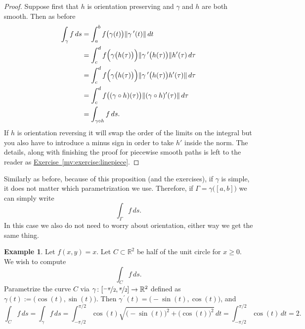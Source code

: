 \documentclass[12pt]{book}
\newcommand{\snorm}[1]{\lVert {#1} \rVert}
\newcommand{\R}{{\mathbb{R}}}
\theoremstyle{plain}
\theoremstyle{remark}
\theoremstyle{definition}
\theoremstyle{exercise}
\theoremstyle{example}
\newtheorem{example}[thm]{Example}
\newcommand{\exerciseref}[1]{\hyperref[#1]{Exercise~\ref*{#1}}}
\begin{document}
\begin{proof}
Suppose first that $h$ is orientation preserving and $\gamma$ and $h$
are both smooth.  Then as before
\begin{equation*}
\begin{split}
\int_{\gamma} f \, ds
& =
\int_a^b 
f\bigl(\gamma(t)\bigr) \snorm{\gamma^{\:\prime}(t)} \, dt
\\
& =
\int_c^d 
f\Bigl(\gamma\bigl(h(\tau)\bigr)\Bigr) \snorm{\gamma^{\:\prime}\bigl(h(\tau)\bigr)} h'(\tau) \, d\tau
\\
& =
\int_c^d 
f\Bigl(\gamma\bigl(h(\tau)\bigr)\Bigr) \snorm{\gamma^{\:\prime}\bigl(h(\tau)\bigr) h'(\tau)} \, d\tau
\\
& =
\int_c^d 
f\bigl((\gamma \circ h)(\tau)\bigr) \snorm{(\gamma \circ h)'(\tau)} \, d\tau
\\
& = 
\int_{\gamma \circ h} f \, ds .
\end{split}
\end{equation*}
If $h$ is orientation reversing it will swap the order of the limits on the
integral but you also have to introduce a minus sign in order
to take $h'$ inside the norm.
The details, along with finishing the proof for piecewise smooth
paths is left to the reader as \exerciseref{mv:exercise:linepiece}.
\end{proof}

Similarly as before, because of this proposition (and the exercises),
if $\gamma$ is simple, it does not matter which
parametrization we use.  Therefore, if $\Gamma = \gamma\bigl( [a,b] \bigr)$ we can
simply write
\begin{equation*}
\int_\Gamma f\, ds .
\end{equation*}
In this case we also do not need to worry about orientation, either way we
get the same thing.

\begin{example}
Let $f(x,y) = x$.  Let $C \subset \R^2$ be half of the unit circle for $x
\geq 0$.  We wish to compute
\begin{equation*}
\int_C f \, ds .
\end{equation*}
Parametrize the curve $C$ via $\gamma \colon
[\nicefrac{-\pi}{2},\nicefrac{\pi}{2}] \to \R^2$ defined as
$\gamma(t) := \bigl(\cos(t),\sin(t)\bigr)$.
Then $\gamma^{\:\prime}(t) = \bigl(-\sin(t),\cos(t)\bigr)$, and
\begin{equation*}
\int_C f \, ds =
\int_\gamma f \, ds
=
\int_{-\pi/2}^{\pi/2} \cos(t) \sqrt{ {\bigl(-\sin(t)\bigr)}^2 +  
{\bigl(\cos(t)\bigr)}^2 } \, dt
=
\int_{-\pi/2}^{\pi/2} \cos(t) \, dt = 2.
\end{equation*}
\end{example}
\end{document}
